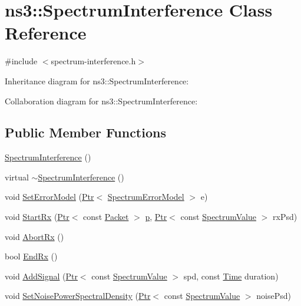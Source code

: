 \hypertarget{classns3_1_1SpectrumInterference}{}\section{ns3\+:\+:Spectrum\+Interference Class Reference}
\label{classns3_1_1SpectrumInterference}


{\ttfamily \#include $<$spectrum-\/interference.\+h$>$}



Inheritance diagram for ns3\+:\+:Spectrum\+Interference\+:


Collaboration diagram for ns3\+:\+:Spectrum\+Interference\+:
\subsection*{Public Member Functions}
\begin{DoxyCompactItemize}
\item 
\hyperlink{classns3_1_1SpectrumInterference_addfb0e0d554da8ca4f9a6fcd67131726}{Spectrum\+Interference} ()
\item 
virtual \hyperlink{classns3_1_1SpectrumInterference_ae92f8786c52ebb582b98e1f0d8522c3f}{$\sim$\+Spectrum\+Interference} ()
\item 
void \hyperlink{classns3_1_1SpectrumInterference_a629cc5ee029790d9b3d511fc13761bea}{Set\+Error\+Model} (\hyperlink{classns3_1_1Ptr}{Ptr}$<$ \hyperlink{classns3_1_1SpectrumErrorModel}{Spectrum\+Error\+Model} $>$ e)
\item 
void \hyperlink{classns3_1_1SpectrumInterference_a8d8c1befb09fede2f2f002b07e214227}{Start\+Rx} (\hyperlink{classns3_1_1Ptr}{Ptr}$<$ const \hyperlink{classns3_1_1Packet}{Packet} $>$ \hyperlink{lte__link__budget__x2__handover__measures_8m_ac9de518908a968428863f829398a4e62}{p}, \hyperlink{classns3_1_1Ptr}{Ptr}$<$ const \hyperlink{classns3_1_1SpectrumValue}{Spectrum\+Value} $>$ rx\+Psd)
\item 
void \hyperlink{classns3_1_1SpectrumInterference_a219160d5db3bcf68e5ec7bed91cad3ad}{Abort\+Rx} ()
\item 
bool \hyperlink{classns3_1_1SpectrumInterference_a3cc0f58922750f680b7bdccbe52d75b6}{End\+Rx} ()
\item 
void \hyperlink{classns3_1_1SpectrumInterference_afa383d6ec1a4b78ce3256da6b959c986}{Add\+Signal} (\hyperlink{classns3_1_1Ptr}{Ptr}$<$ const \hyperlink{classns3_1_1SpectrumValue}{Spectrum\+Value} $>$ spd, const \hyperlink{classns3_1_1Time}{Time} duration)
\item 
void \hyperlink{classns3_1_1SpectrumInterference_a2252ceedb5f3eaeaaca0ab06e2d63f47}{Set\+Noise\+Power\+Spectral\+Density} (\hyperlink{classns3_1_1Ptr}{Ptr}$<$ const \hyperlink{classns3_1_1SpectrumValue}{Spectrum\+Value} $>$ noise\+Psd)
\end{DoxyCompactItemize}
